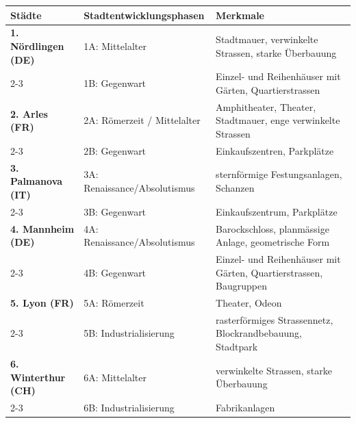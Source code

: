 \begin{myexercise}
\begin{myanswer}
\begin{table}[H]
\centering
\begin{tabular}{p{4cm}|p{4cm}|p{5cm}}
\textbf{Städte} & \textbf{Stadtentwicklungsphasen} & \textbf{Merkmale} \\ \midrule\midrule
\textbf{1. Nördlingen (DE)} & 1A: Mittelalter & Stadtmauer, verwinkelte Strassen, starke Überbauung \\ \cline{2-3}
& 1B: Gegenwart & Einzel- und Reihenhäuser mit Gärten, Quartierstrassen \\ \midrule
\textbf{2. Arles (FR)} & 2A: Römerzeit / Mittelalter & Amphitheater, Theater, Stadtmauer, enge verwinkelte Strassen \\ \cline{2-3}
& 2B: Gegenwart & Einkaufszentren, Parkplätze \\ \midrule
\textbf{3. Palmanova (IT)} & 3A: Renaissance/Absolutismus & sternförmige Festungsanlagen, Schanzen \\ \cline{2-3}
& 3B: Gegenwart & Einkaufszentrum, Parkplätze \\ \midrule
\textbf{4. Mannheim (DE)} & 4A: Renaissance/Absolutismus & Barockschloss, planmässige Anlage, geometrische Form \\ \cline{2-3}
& 4B: Gegenwart & Einzel- und Reihenhäuser mit Gärten, Quartierstrassen, Baugruppen \\ \midrule
\textbf{5. Lyon (FR)} & 5A: Römerzeit & Theater, Odeon \\ \cline{2-3}
& 5B: Industrialisierung & rasterförmiges Strassennetz, Blockrandbebauung, Stadtpark \\ \midrule
\textbf{6. Winterthur (CH)} & 6A: Mittelalter & verwinkelte Strassen, starke Überbauung \\ \cline{2-3}
& 6B: Industrialisierung & Fabrikanlagen \\
\end{tabular}
\end{table}
\end{myanswer}
\end{myexercise}



